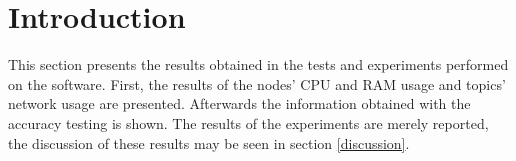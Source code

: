\section{Introduction}

This section presents the results obtained in the tests and experiments performed on the software. 
First, the results of the nodes' CPU and RAM usage and topics' network usage are presented. 
Afterwards the information obtained with the accuracy testing is shown. 
The results of the experiments are merely reported, the discussion of these results may be seen in section \ref{discussion}.